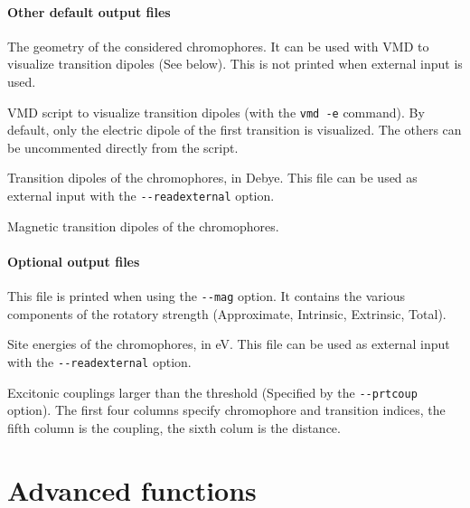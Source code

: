 \documentclass[a4paper,11pt]{article}
\begin{document}
\paragraph*{Other default output files}
\begin{description}[labelsep=10pt, align=left, labelwidth=85pt,labelindent=0pt,leftmargin=95pt]
\item[\texttt{geometry.xyz}] The geometry of the considered chromophores. It can be used with VMD to visualize transition dipoles (See below). This is not printed when external input is used.
\item[\texttt{visudipo.vmd}] VMD script to visualize transition dipoles (with the \texttt{vmd -e} command). By default, only the electric dipole of the first transition is visualized. The others can be uncommented directly from the script. 
\item[\texttt{dipo.out}] Transition dipoles of the chromophores, in Debye. This file can be used as external input with the \texttt{-{}-readexternal} option.
\item[\texttt{magdipo.out}] Magnetic transition dipoles of the chromophores.
\end{description}

\paragraph*{Optional output files}
\begin{description}[labelsep=10pt, align=left, labelwidth=85pt,labelindent=0pt,leftmargin=95pt]
\item[\texttt{component.out}] This file is printed when using the \texttt{-{}-mag} option. It contains the various components of the rotatory strength (Approximate, Intrinsic, Extrinsic, Total).
\item[\texttt{site.out}] Site energies of the chromophores, in eV. This file can be used as external input with the \texttt{-{}-readexternal} option.
\item[\texttt{coup.out}] Excitonic couplings larger than the threshold (Specified by the \texttt{-{}-prtcoup} option). The first four columns specify chromophore and transition indices, the fifth column is the coupling, the sixth colum is the distance.
\end{description}


\section{Advanced functions}
\end{document}
